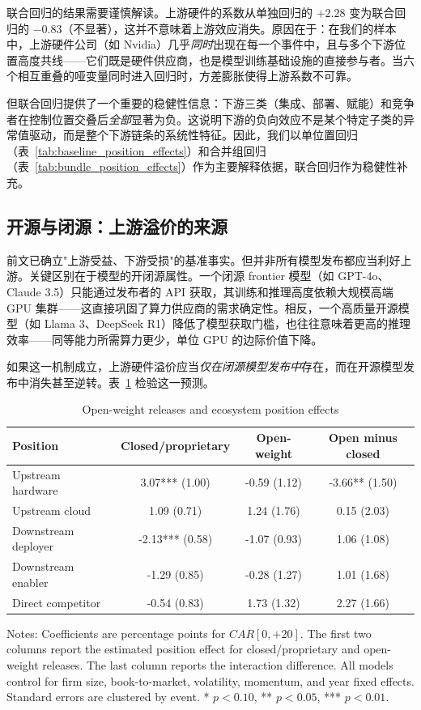 \documentclass[11pt,fontset=fandol,a4paper]{ctexart}
\begin{document}
联合回归的结果需要谨慎解读。上游硬件的系数从单独回归的 $+2.28$ 变为联合回归的 $-0.83$（不显著），这并不意味着上游效应消失。原因在于：在我们的样本中，上游硬件公司（如 Nvidia）几乎\emph{同时}出现在每一个事件中，且与多个下游位置高度共线——它们既是硬件供应商，也是模型训练基础设施的直接参与者。当六个相互重叠的哑变量同时进入回归时，方差膨胀使得上游系数不可靠。

但联合回归提供了一个重要的稳健性信息：下游三类（集成、部署、赋能）和竞争者在控制位置交叠后\emph{全部}显著为负。这说明下游的负向效应不是某个特定子类的异常值驱动，而是整个下游链条的系统性特征。因此，我们以单位置回归（表~\ref{tab:baseline_position_effects}）和合并组回归（表~\ref{tab:bundle_position_effects}）作为主要解释依据，联合回归作为稳健性补充。

\subsection{开源与闭源：上游溢价的来源}\label{sec:openclose}

前文已确立"上游受益、下游受损"的基准事实。但并非所有模型发布都应当利好上游。关键区别在于模型的开闭源属性。一个闭源 frontier 模型（如 GPT-4o、Claude 3.5）只能通过发布者的 API 获取，其训练和推理高度依赖大规模高端 GPU 集群——这直接巩固了算力供应商的需求确定性。相反，一个高质量开源模型（如 Llama 3、DeepSeek R1）降低了模型获取门槛，也往往意味着更高的推理效率——同等能力所需算力更少，单位 GPU 的边际价值下降。

如果这一机制成立，上游硬件溢价应当\emph{仅在闭源模型发布中}存在，而在开源模型发布中消失甚至逆转。表~\ref{tab:open_closed_position_effects} 检验这一预测。

\begin{table}[H]
\centering
\small
\caption{Open-weight releases and ecosystem position effects}
\label{tab:open_closed_position_effects}
\begin{tabular}{lccc}
\toprule
Position & Closed/proprietary & Open-weight & Open minus closed\\
\midrule
Upstream hardware & 3.07*** (1.00) & -0.59 (1.12) & -3.66** (1.50)\\
Upstream cloud & 1.09 (0.71) & 1.24 (1.76) & 0.15 (2.03)\\
Downstream deployer & -2.13*** (0.58) & -1.07 (0.93) & 1.06 (1.08)\\
Downstream enabler & -1.29 (0.85) & -0.28 (1.27) & 1.01 (1.68)\\
Direct competitor & -0.54 (0.83) & 1.73 (1.32) & 2.27 (1.66)\\
\bottomrule
\end{tabular}
\begin{minipage}{0.94\linewidth}
\vspace{0.4em}
\footnotesize
Notes: Coefficients are percentage points for $CAR[0,+20]$. The first two columns report the estimated position effect for closed/proprietary and open-weight releases. The last column reports the interaction difference. All models control for firm size, book-to-market, volatility, momentum, and year fixed effects. Standard errors are clustered by event. * $p<0.10$, ** $p<0.05$, *** $p<0.01$.
\end{minipage}
\end{table}
\end{document}
